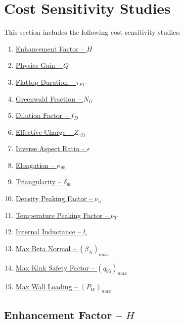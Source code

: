 \section{Cost Sensitivity Studies}

This section includes the following cost sensitivity studies: ~

\begin{enumerate}
  \item \hyperref[subsection:sensitivity_H]{ Enhancement Factor -- $H$  }
  \item \hyperref[subsection:sensitivity_Q]{ Physics Gain -- $Q$  }
  \item \hyperref[subsection:sensitivity_tau_FT]{ Flattop Duration -- $\tau_{FT}$  }
  \item \hyperref[subsection:sensitivity_N_G]{ Greenwald Fraction -- $N_G$  }
  \item \hyperref[subsection:sensitivity_f_D]{ Dilution Factor -- $f_D$  }
  \item \hyperref[subsection:sensitivity_Z_eff]{ Effective Charge -- $Z_{eff}$  }
  \item \hyperref[subsection:sensitivity_epsilon]{ Inverse Aspect Ratio -- $\epsilon$  }
  \item \hyperref[subsection:sensitivity_kappa_95]{ Elongation -- $\kappa_{95}$  }
  \item \hyperref[subsection:sensitivity_delta_95]{ Triangularity -- $\delta_{95}$  }
  \item \hyperref[subsection:sensitivity_nu_n]{ Density Peaking Factor -- $\nu_n$  }
  \item \hyperref[subsection:sensitivity_nu_T]{ Temperature Peaking Factor -- $\nu_T$  }
  \item \hyperref[subsection:sensitivity_l_i]{ Internal Inductance -- $l_i$  }
  \item \hyperref[subsection:sensitivity_max_beta_N]{ Max Beta Normal -- $(\beta_N)_{max}$  }
  \item \hyperref[subsection:sensitivity_max_q_95]{ Max Kink Safety Factor -- $({q_{95}})_{max}$  }
  \item \hyperref[subsection:sensitivity_max_P_W]{ Max Wall Loading -- $({P_W})_{max}$ }
\end{enumerate}

\clearpage

\newpage

\subsection*{ Enhancement Factor -- $H$ }
  \label{subsection:sensitivity_H}


